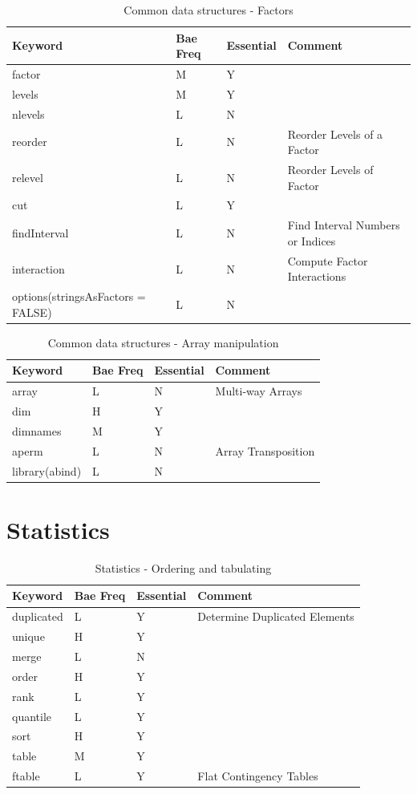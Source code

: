 \documentclass[11pt,]{krantz}
\theoremstyle{definition}
\theoremstyle{definition}
\theoremstyle{remark}
\begin{document}
\begin{table}

\caption{\label{tab:knitchunk14}Common data structures - Factors }
\centering
\begin{tabular}[t]{llll}
\toprule
Keyword & Bae Freq & Essential & Comment\\
\midrule
factor & M & Y & \\
levels & M & Y & \\
nlevels & L & N & \\
reorder & L & N & Reorder Levels of a Factor\\
relevel & L & N & Reorder Levels of Factor\\
\addlinespace
cut & L & Y & \\
findInterval & L & N & Find Interval Numbers or Indices\\
interaction & L & N & Compute Factor Interactions\\
options(stringsAsFactors = FALSE) & L & N & \\
\bottomrule
\end{tabular}
\end{table}

\begin{table}

\caption{\label{tab:knitchunk15}Common data structures - Array manipulation}
\centering
\begin{tabular}[t]{llll}
\toprule
Keyword & Bae Freq & Essential & Comment\\
\midrule
array & L & N & Multi-way Arrays\\
dim & H & Y & \\
dimnames & M & Y & \\
aperm & L & N & Array Transposition\\
library(abind) & L & N & \\
\bottomrule
\end{tabular}
\end{table}

\section{Statistics}\label{statistics}

\begin{table}

\caption{\label{tab:knitchunk16}Statistics - Ordering and tabulating }
\centering
\begin{tabular}[t]{llll}
\toprule
Keyword & Bae Freq & Essential & Comment\\
\midrule
duplicated & L & Y & Determine Duplicated Elements\\
unique & H & Y & \\
merge & L & N & \\
order & H & Y & \\
rank & L & Y & \\
\addlinespace
quantile & L & Y & \\
sort & H & Y & \\
table & M & Y & \\
ftable & L & Y & Flat Contingency Tables\\
\bottomrule
\end{tabular}
\end{table}
\end{document}
